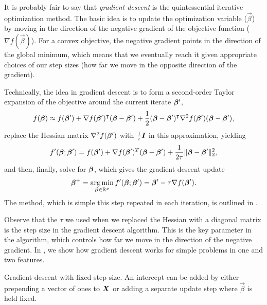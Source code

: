It is probably fair to say that \emph{gradient descent} is the quintessential iterative optimization method. The basic idea is to update the optimization variable (\(\vec{\beta}\)) by moving in the direction of the negative gradient of the objective function (\(\nabla f (\vec{\beta})\)). For a convex objective, the negative gradient points in the direction of the global minimum, which means that we eventually reach it given appropriate choices of our step sizes (how far we move in the opposite direction of the gradient).

Technically, the idea in gradient descent is to form a second-order Taylor expansion of the objective around the current iterate \(\boldsymbol{\beta}'\),
\begin{equation*}
  f(\boldsymbol{\beta}) \approx f(\boldsymbol{\beta}') + \nabla f(\boldsymbol{\beta}')^\intercal (\boldsymbol{\beta} - \boldsymbol{\beta}') + \frac{1}{2}(\boldsymbol{\beta} - \boldsymbol{\beta}')^\intercal \nabla^2 f(\boldsymbol{\beta}')(\boldsymbol{\beta} - \boldsymbol{\beta}'),
\end{equation*}
replace the Hessian matrix \(\nabla^2 f(\boldsymbol{\beta}')\) with \(\frac {1}{\tau} \boldsymbol{I}\) in this approximation, yielding
\begin{equation*}
  f'(\boldsymbol{\beta}; \boldsymbol{\beta}') = f(\boldsymbol{\beta}') + \nabla f(\boldsymbol{\beta}')^T(\boldsymbol{\beta} - \boldsymbol{\beta}') + \frac{1}{2\tau}\lVert \boldsymbol{\beta} - \boldsymbol{\beta}'\rVert_2^2,
\end{equation*}
and then, finally, solve for \(\boldsymbol{\beta}\), which gives the gradient descent update
\[
  \boldsymbol{\beta}^+ =\operatorname*{arg\,min}_{\boldsymbol{\beta} \in \mathbb{R}^p} f'(\boldsymbol{\beta}; \boldsymbol{\beta}') = \boldsymbol{\beta}' - \tau \nabla f(\boldsymbol{\beta}').
\]
The method, which is simple this step repeated in each iteration, is outlined in .

Observe that the \(\tau\) we used when we replaced the Hessian with a diagonal matrix is the step size in the gradient descent algorithm. This is the key parameter in the algorithm, which controls how far we move in the direction of the negative gradient.
In , we show how gradient descent works for simple problems in one and two features.

\begin{algorithm}
  \caption{Gradient descent with fixed step size. An intercept can be added by either prepending a vector of ones to \(\boldsymbol{X}\) or adding a separate update step where \(\vec{\beta}\) is held fixed.}
  \label{alg:gradient-descent}

\end{algorithm}

